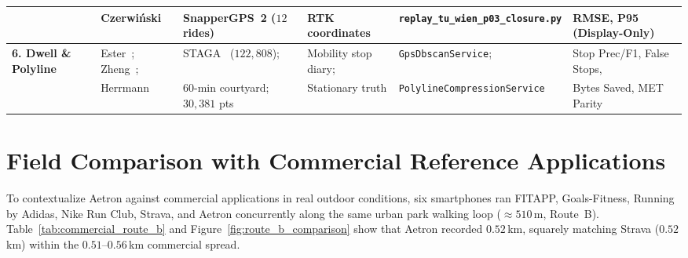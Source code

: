 \begin{table}[htbp]
{\begin{tabular}{@{}llllll@{}}
 & Czerwi{\'n}ski~\cite{czerwinski2026reconstruction} & SnapperGPS~2 ($12$ rides) & RTK coordinates & \texttt{replay\_tu\_wien\_p03\_closure.py} & RMSE, P95 (Display-Only) \\ \midrule
\textbf{6. Dwell \& Polyline} & Ester~\cite{ester1996dbscan}; Zheng~\cite{zheng2009mining}; & STAGA~\cite{spang2022staga} ($122{,}808$); & Mobility stop diary; & \texttt{GpsDbscanService}; & Stop Prec/F1, False Stops, \\
 & Herrmann~\cite{herrmann2024compendium} & $60$-min courtyard; $30{,}381$ pts & Stationary truth & \texttt{PolylineCompressionService} & Bytes Saved, MET Parity \\ \bottomrule
\end{tabular}
}
\end{table}

\section{Field Comparison with Commercial Reference Applications}
\label{sec:eval_commercial_field}
To contextualize Aetron against commercial applications in real outdoor conditions, six smartphones ran FITAPP, Goals-Fitness, Running by Adidas, Nike Run Club, Strava, and Aetron concurrently along the same urban park walking loop ($\approx 510$\,m, Route~B). Table~\ref{tab:commercial_route_b} and Figure~\ref{fig:route_b_comparison} show that Aetron recorded $0.52$\,km, squarely matching Strava ($0.52$\,km) within the $0.51$--$0.56$\,km commercial spread.

\begin{table}[htbp]
\centering
\caption{Recorded field metrics across six fitness applications on Route~B ($\approx 510$\,m urban walking loop; Strava summary screenshot omitted calories).}
\label{tab:commercial_route_b}
\end{table}

